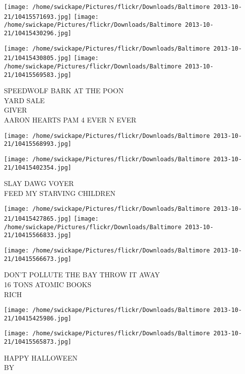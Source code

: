 \documentclass[10pt,letterpaper]{article}
\begin{document}
\texttt{[image: /home/swickape/Pictures/flickr/Downloads/Baltimore 2013-10-21/10415571693.jpg]}
\texttt{[image: /home/swickape/Pictures/flickr/Downloads/Baltimore 2013-10-21/10415430296.jpg]}

\texttt{[image: /home/swickape/Pictures/flickr/Downloads/Baltimore 2013-10-21/10415430805.jpg]}
\texttt{[image: /home/swickape/Pictures/flickr/Downloads/Baltimore 2013-10-21/10415569583.jpg]}

SPEEDWOLF BARK AT THE POON\\
YARD SALE\\
GIVER\\
AARON HEARTS PAM 4 EVER N EVER\\
\pagebreak

\texttt{[image: /home/swickape/Pictures/flickr/Downloads/Baltimore 2013-10-21/10415568993.jpg]}

\vspace{0.25in}
\texttt{[image: /home/swickape/Pictures/flickr/Downloads/Baltimore 2013-10-21/10415402354.jpg]}

SLAY DAWG VOYER\\
FEED MY STARVING CHILDREN\\
\pagebreak

\texttt{[image: /home/swickape/Pictures/flickr/Downloads/Baltimore 2013-10-21/10415427865.jpg]}
\texttt{[image: /home/swickape/Pictures/flickr/Downloads/Baltimore 2013-10-21/10415566833.jpg]}

\vspace{0.25in}
\texttt{[image: /home/swickape/Pictures/flickr/Downloads/Baltimore 2013-10-21/10415566673.jpg]}

DON'T POLLUTE THE BAY THROW IT AWAY\\
16 TONS ATOMIC BOOKS\\
RICH\\
\pagebreak

\texttt{[image: /home/swickape/Pictures/flickr/Downloads/Baltimore 2013-10-21/10415425986.jpg]}

\vspace{0.25in}
\texttt{[image: /home/swickape/Pictures/flickr/Downloads/Baltimore 2013-10-21/10415565873.jpg]}

HAPPY HALLOWEEN\\
BY\\
\pagebreak
\end{document}
